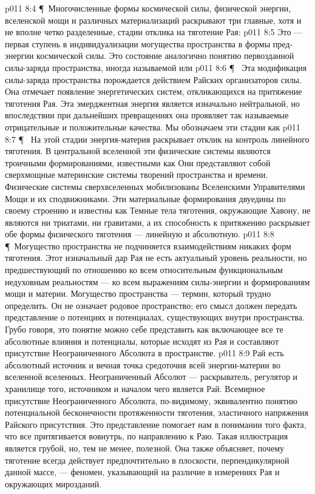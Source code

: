 \vs p011 8:4 \P\ Многочисленные формы космической силы, физической энергии, вселенской мощи и различных материализаций раскрывают три главные, хотя и не вполне четко разделенные, стадии отклика на тяготение Рая:
\vs p011 8:5 \bibnobreakspace {} Это --- первая ступень в индивидуализации могущества пространства в формы пред\hyp{}энергии космической силы. Это состояние аналогично понятию первозданной силы\hyp{}заряда пространства, иногда называемой  или 
\vs p011 8:6 \P\ \bibnobreakspace {} Эта модификация силы\hyp{}заряда пространства порождается действием Райских организаторов силы. Она отмечает появление энергетических систем, откликающихся на притяжение тяготения Рая. Эта эмерджентная энергия является изначально нейтральной, но впоследствии при дальнейших превращениях она проявляет так называемые отрицательные и положительные качества. Мы обозначаем эти стадии как 
\vs p011 8:7 \P\ \bibnobreakspace {} На этой стадии энергия\hyp{}материя раскрывает отклик на контроль линейного тяготения. В центральной вселенной эти физические системы являются троичными формированиями, известными как  Они представляют собой сверхмощные материнские системы творений пространства и времени. Физические системы сверхвселенных мобилизованы Вселенскими Управителями Мощи и их сподвижниками. Эти материальные формирования двуедины по своему строению и известны как  Темные тела тяготения, окружающие Хавону, не являются ни триатами, ни гравитами, а их способность к притяжению раскрывает обе формы физического тяготения --- линейную и абсолютную.
\vs p011 8:8 \P\ Могущество пространства не подчиняется взаимодействиям никаких форм тяготения. Этот изначальный дар Рая не есть актуальный уровень реальности, но предшествующий по отношению ко всем относительным функциональным недуховным реальностям --- ко всем выражениям силы\hyp{}энергии и формированиям мощи и материи. Могущество пространства --- термин, который трудно определить. Он не означает родовое пространство; его смысл должен передать представление о потенциях и потенциалах, существующих внутри пространства. Грубо говоря, это понятие можно себе представить как включающее все те абсолютные влияния и потенциалы, которые исходят из Рая и составляют присутствие Неограниченного Абсолюта в пространстве.
\vs p011 8:9 Рай есть абсолютный источник и вечная точка средоточия всей энергии\hyp{}материи во вселенной вселенных. Неограниченный Абсолют --- раскрыватель, регулятор и хранилище того, источником и началом чего является Рай. Всемирное присутствие Неограниченного Абсолюта, по\hyp{}видимому, эквивалентно понятию потенциальной бесконечности протяженности тяготения, эластичного напряжения Райского присутствия. Это представление помогает нам в понимании того факта, что все притягивается вовнутрь, по направлению к Раю. Такая иллюстрация является грубой, но, тем не менее, полезной. Она также объясняет, почему тяготение всегда действует предпочтительно в плоскости, перпендикулярной данной массе, --- феномен, указывающий на различие в измерениях Рая и окружающих мирозданий.
